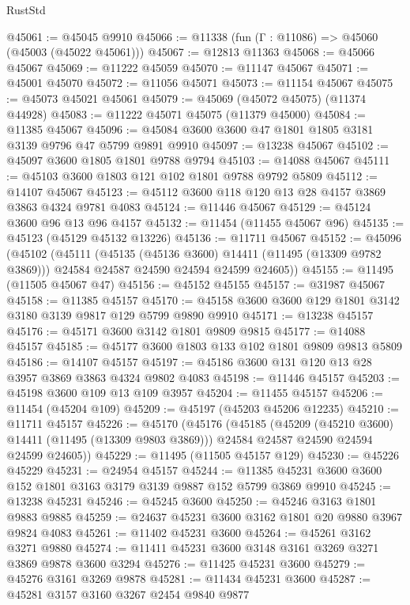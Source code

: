 \begin{lexlean}{RustStd}
\begin{coremodule}
@45061 := @45045 @9910
@45066 := @11338 (fun (Γ : @11086) => @45060 (@45003 (@45022 @45061)))
@45067 := @12813 @11363
@45068 := @45066 @45067
@45069 := @11222 @45059
@45070 := @11147 @45067
@45071 := @45001 @45070
@45072 := @11056 @45071
@45073 := @11154 @45067
@45075 := @45073 @45021 @45061
@45079 := @45069 (@45072 @45075) (@11374 @44928)
@45083 := @11222 @45071 @45075 (@11379 @45000)
@45084 := @11385 @45067
@45096 := @45084 @3600 @3600 @47 @1801 @1805 @3181 @3139 @9796 @47 @5799 @9891 @9910
@45097 := @13238 @45067
@45102 := @45097 @3600 @1805 @1801 @9788 @9794
@45103 := @14088 @45067
@45111 := @45103 @3600 @1803 @121 @102 @1801 @9788 @9792 @5809
@45112 := @14107 @45067
@45123 := @45112 @3600 @118 @120 @13 @28 @4157 @3869 @3863 @4324 @9781 @4083
@45124 := @11446 @45067
@45129 := @45124 @3600 @96 @13 @96 @4157
@45132 := @11454 (@11455 @45067 @96)
@45135 := @45123 (@45129 @45132 @13226)
@45136 := @11711 @45067
@45152 := @45096
    (@45102
      (@45111
        (@45135 (@45136 @3600) @14411 (@11495 (@13309 @9782 @3869)))
        @24584
        @24587
        @24590
        @24594
        @24599
        @24605))
@45155 := @11495 (@11505 @45067 @47)
@45156 := @45152 @45155
@45157 := @31987 @45067
@45158 := @11385 @45157
@45170 := @45158 @3600 @3600 @129 @1801 @3142 @3180 @3139 @9817 @129 @5799 @9890 @9910
@45171 := @13238 @45157
@45176 := @45171 @3600 @3142 @1801 @9809 @9815
@45177 := @14088 @45157
@45185 := @45177 @3600 @1803 @133 @102 @1801 @9809 @9813 @5809
@45186 := @14107 @45157
@45197 := @45186 @3600 @131 @120 @13 @28 @3957 @3869 @3863 @4324 @9802 @4083
@45198 := @11446 @45157
@45203 := @45198 @3600 @109 @13 @109 @3957
@45204 := @11455 @45157
@45206 := @11454 (@45204 @109)
@45209 := @45197 (@45203 @45206 @12235)
@45210 := @11711 @45157
@45226 := @45170
    (@45176
      (@45185
        (@45209 (@45210 @3600) @14411 (@11495 (@13309 @9803 @3869)))
        @24584
        @24587
        @24590
        @24594
        @24599
        @24605))
@45229 := @11495 (@11505 @45157 @129)
@45230 := @45226 @45229
@45231 := @24954 @45157
@45244 := @11385 @45231 @3600 @3600 @152 @1801 @3163 @3179 @3139 @9887 @152 @5799 @3869 @9910
@45245 := @13238 @45231
@45246 := @45245 @3600
@45250 := @45246 @3163 @1801 @9883 @9885
@45259 := @24637 @45231 @3600 @3162 @1801 @20 @9880 @3967 @9824 @4083
@45261 := @11402 @45231 @3600
@45264 := @45261 @3162 @3271 @9880
@45274 := @11411 @45231 @3600 @3148 @3161 @3269 @3271 @3869 @9878 @3600 @3294
@45276 := @11425 @45231 @3600
@45279 := @45276 @3161 @3269 @9878
@45281 := @11434 @45231 @3600
@45287 := @45281 @3157 @3160 @3267 @2454 @9840 @9877

\end{coremodule}
\end{lexlean}

